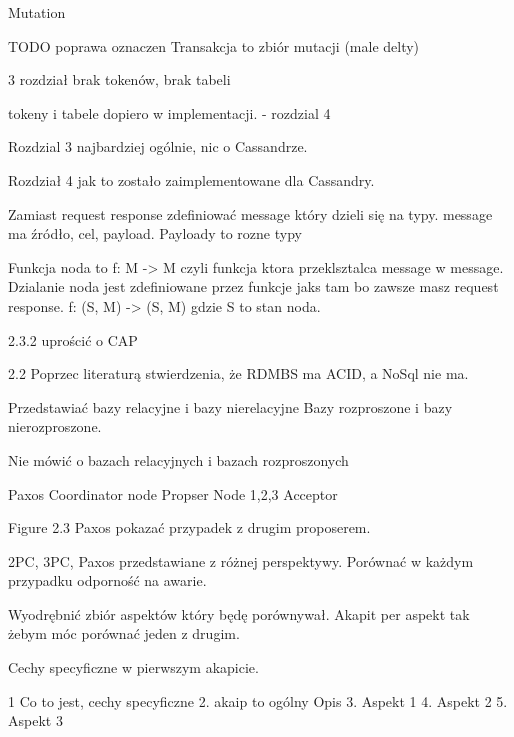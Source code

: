 Mutation 

TODO poprawa oznaczen
Transakcja to zbiór mutacji (male delty)

3 rozdział brak tokenów, brak tabeli

tokeny i tabele dopiero w implementacji.  - rozdzial 4

Rozdzial 3 najbardziej ogólnie, nic o Cassandrze.

Rozdział 4 jak to zostało zaimplementowane dla Cassandry.

Zamiast request response zdefiniować message który dzieli się na typy.
message ma źródło, cel, payload. Payloady to rozne typy

Funkcja noda to f: M -> M 
czyli funkcja ktora przeklsztalca message w message. 
Dzialanie noda jest zdefiniowane przez funkcje jaks tam bo zawsze masz request response.
f: (S, M) -> (S, M)
gdzie S to stan noda.

2.3.2 uprościć o CAP

2.2
Poprzec literaturą stwierdzenia, że RDMBS ma ACID, a NoSql nie ma.

Przedstawiać bazy relacyjne i bazy nierelacyjne
Bazy rozproszone i bazy nierozproszone.

Nie mówić o bazach relacyjnych i bazach rozproszonych

Paxos
Coordinator node Propser
Node 1,2,3 Acceptor

Figure 2.3 Paxos pokazać przypadek z drugim proposerem.

2PC, 3PC, Paxos przedstawiane z różnej perspektywy.
Porównać w każdym przypadku odporność na awarie.

Wyodrębnić zbiór aspektów który będę porównywał. 
Akapit per aspekt tak żebym móc porównać jeden z drugim.

Cechy specyficzne w pierwszym akapicie.

1 Co to jest, cechy specyficzne
2. akaip to ogólny Opis
3. Aspekt 1
4. Aspekt 2
5. Aspekt 3


